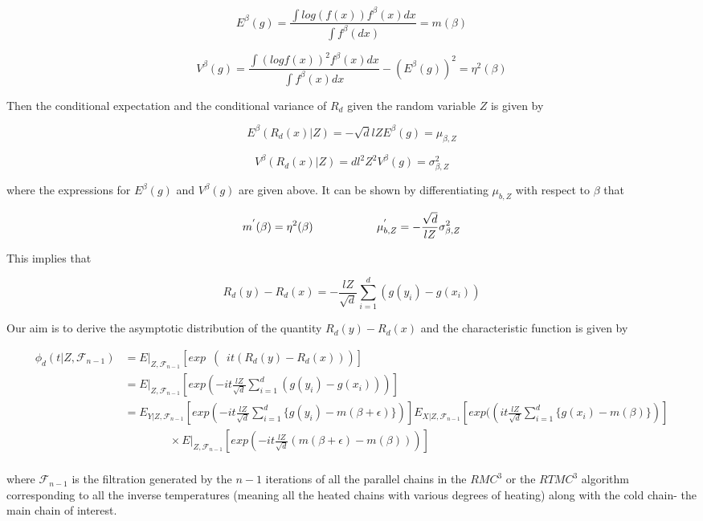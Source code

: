 \documentclass[11pt]{article}
\renewcommand{\b}{\ensuremath{\beta}}
\newcommand{\e}{\ensuremath{\epsilon}}
\begin{document}
\[  E^{\b} (g) = \frac{\int log(f(x)) f^{\b}(x)dx}{\int f^{\b}(dx)} = m(\b)  \]

\[  V^{\b}(g) =  \frac{\int (log f(x))^2 f^{\b}(x)dx}{\int f^{\b}(x)dx} - (E^{\b}(g))^2 = \eta^2 (\b) \]

Then the conditional expectation and the conditional variance of $R_d$ given the random variable $Z$ is given by

\[ E^{\beta} (R_{d}(x)|Z) = -\sqrt{d}lZ E^{\b} (g) = \mu_{\b,Z}  \]

\[ V^{\b} (R_{d}(x) |Z) = d l^{2} Z^{2} V^{\b} (g) = \sigma^2_{\beta,Z}  \]

where the expressions for $E^{\b}(g)$ and $V^{\b}(g)$ are given above. It can be shown by differentiating $\mu_{b,Z} $ with respect to $\b$ that 

\[ m^{'}(\b) = \eta^{2} (\b)   \hspace{2 cm}   \mu^{'}_{b,Z} = -\frac{\sqrt{d}}{lZ} \sigma^2_{\b,Z}    \]

This implies that 

\[ R_{d}(y) - R_{d}(x) = -\frac{lZ}{\sqrt{d}} \sum_{i=1}^{d} (g(y_{i})-g(x_{i}))  \]

Our aim is to derive the asymptotic distribution of the quantity $R_{d}(y)-R_{d}(x)$ and the characteristic function is given by 

\begin{align*}
\phi_{d}(t |Z, \mathcal{F}_{n-1})  & = E |_{Z,  \mathcal{F}_{n-1}} \left [exp\phantom{\frac{1}{2}} \left ( \phantom{\frac{1}{2}} it(R_{d}(y)-R_{d}(x)) \right) \right ]  \\
  & = E |_{Z,  \mathcal{F}_{n-1}} \left [ exp \left (-it \frac{lZ}{\sqrt{d}} \sum_{i=1}^{d} (g(y_{i}) -g(x_{i}))\right ) \right ]  \\
  & = E _{Y|{Z,  \mathcal{F}_{n-1}}}\left [ exp \left (-it \frac{lZ}{\sqrt{d}} \sum_{i=1}^{d} \{g(y_i) - m(\b+\e) \} \right )  \right ]  E_{X|{Z,  \mathcal{F}_{n-1}}} \left [ exp( \left (it \frac{lZ}{\sqrt{d}} \sum_{i=1}^{d} \{g(x_i) - m(\b)\} \right )  \right ] \\
  & \qquad \qquad \times E |_{{Z},  \mathcal{F}_{n-1}} \left [ exp \left (-it \frac{lZ}{\sqrt{d}}(m(\b+\e) - m(\b)) \right ) \right ] \\
\end{align*}

where $\mathcal{F}_{n-1}$ is the filtration generated by the $n-1$ iterations of all the parallel chains in the $RMC^{3}$ or the $RTMC^{3}$ algorithm corresponding to all the inverse temperatures (meaning all the heated chains with various degrees of heating) along with the cold chain- the main chain of interest.
\end{document}
